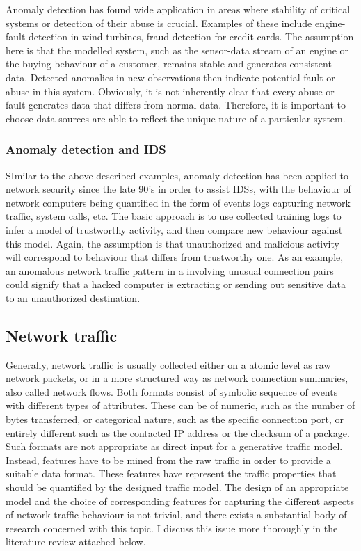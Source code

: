 \documentclass[a4paper,12pt,twoside]{report}
\begin{document}
Anomaly detection has found wide application in areas where stability of  critical systems or detection of their abuse is crucial. Examples of these include engine-fault detection in wind-turbines, fraud detection for credit cards. The assumption here is that the modelled system, such as the sensor-data stream of an engine or the buying behaviour of a customer, remains stable and generates consistent data. Detected anomalies in new observations then indicate potential fault or abuse in this system. Obviously, it is not inherently clear that every abuse or fault generates data that differs from normal data. Therefore, it is important to choose data sources are able to reflect the unique nature of a particular system.

\subsubsection{Anomaly detection and IDS}

SImilar to the above described examples, anomaly detection has been applied to network security since the late 90's in order to assist IDSs, with the behaviour of network computers being quantified in the form of events logs capturing network traffic, system calls, etc. The basic approach is to use collected training logs to infer a model of trustworthy activity, and then compare new behaviour against this model. Again, the assumption is that unauthorized and malicious activity will correspond to behaviour that differs from trustworthy one. As an example, an anomalous network traffic pattern in a involving unusual connection pairs could
signify that a hacked computer is extracting or sending out sensitive data to an unauthorized destination.


\subsection{Network traffic}

Generally, network traffic is usually collected either on a atomic level as raw network packets, or in a more structured way as network connection summaries, also called network flows. Both formats consist of symbolic sequence of events with different types of attributes. These can be of numeric, such as the number of bytes transferred, or categorical nature, such as the specific connection port, or entirely different such as the contacted IP address or the checksum of a package. Such formats are not appropriate as direct input for a generative traffic model. Instead, features have to be mined from the raw traffic in order to provide a suitable data format. These features have represent the traffic properties that should be quantified by the designed traffic model. The design of an appropriate model and the choice of corresponding features for capturing the different aspects of network traffic behaviour is not trivial, and there exists a substantial body of research concerned with this topic. I discuss this issue more thoroughly in the literature review attached below.
\end{document}
